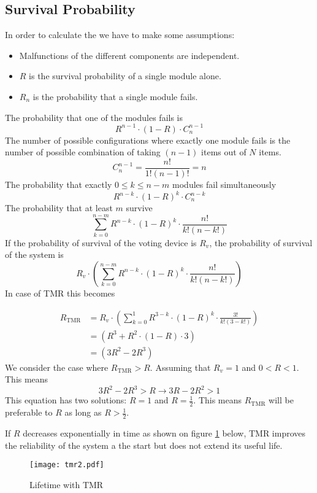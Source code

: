 \documentclass[../main.tex]{subfiles}
\begin{document}
\subsection{Survival Probability}
In order to calculate the  we have to make some assumptions:
\begin{itemize}
	\item Malfunctions of the different components are independent.
	\item $R$ is the survival probability of a single module alone.
	\item $R_n$ is the probability that a single module fails.
\end{itemize}
The probability that one of the modules fails is
\[
R^{n-1} \cdot (1 - R) \cdot C^{n-1}_{n}
\]
The number of possible configurations where exactly one module fails is the number of possible combination of taking $(n-1)$ items out of $N$ items.
\[
C^{n-1}_{n} = \frac{n!}{1!(n-1)!} = n
\]
The probability that exactly $0 \leq k \leq n-m$ modules fail simultaneously 
\[
R^{n-k} \cdot (1 - R)^k \cdot C^{n-k}_{n}
\]
The probability that at least $m$ survive
\[
\sum^{n-m}_{k=0} R^{n-k} \cdot (1 - R)^k \cdot \frac{n!}{k!(n-k!)}
\]
If the probability of survival of the voting device is $R_v$, the probability of survival of the system is
\[
R_v \cdot \left( \sum^{n-m}_{k=0} R^{n-k} \cdot (1 - R)^k \cdot \frac{n!}{k!(n-k!)} \right)
\]
In case of TMR this becomes

\begin{align*}
R_\text{TMR} & = R_v \cdot \left( \sum^{1}_{k=0} R^{3-k} \cdot (1 - R)^k \cdot \frac{3!}{k!(3-k!)} \right) \\
& = \left( R^3 + R^2 \cdot (1-R) \cdot 3 \right) \\
& = \left( 3R^2 - 2R^3 \right)
\end{align*}
We consider the case where $R_{\text{TMR}} > R$. Assuming that $R_v = 1$ and $0 < R < 1$. This means
\[
3R^2 - 2R^3 > R \rightarrow 3R-2R^2 > 1
\]
This equation has two solutions: $R = 1$ and $R = \frac{1}{2}$. This means $R_{\text{TMR}}$ will be preferable to $R$ as long as $R > \frac{1}{2}$. 

\begin{exmp}
	If $R$ decreases exponentially in time as shown on figure \ref{tmr2} below, TMR improves the reliability of the system a the start but does not extend its useful life.
\begin{figure}[H]
    \centering
    \texttt{[image: tmr2.pdf]}
    \caption{Lifetime with TMR}
    \label{tmr2}
\end{figure}
\end{exmp}
\end{document}
